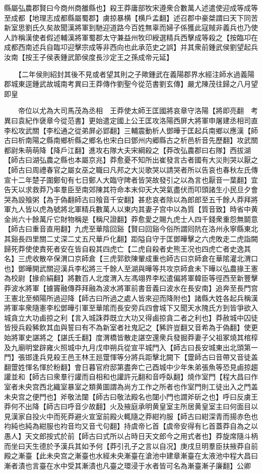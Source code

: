 縣屬弘農郡賢曰今商州商雒縣也】殺王莽庸部牧宋遵衆合數萬人述遣使迎成等成等至成都【地理志成都縣屬蜀郡】虜掠暴横【横戶孟翻】述召郡中豪桀謂曰天下同苦新室思劉氏久矣故聞漢將軍到馳迎道路今百姓無辜而婦子係獲此寇賊非義兵也乃使人詐稱漢使者假述輔漢將軍蜀郡太守兼益州牧印綬選精兵西擊成等殺之【按臨卭在成都西南述兵自臨卭迎擊宗成等非西向也此承范史之誤】并其衆前鍾武侯劉望起兵汝南【按王子侯表鍾武節侯度長沙定王之孫成帝元延】

　　【二年侯則紹封其後不見或者望其則之子歟鍾武在義陽郡界水經注師水過義陽郡城東逕鍾武故城南考異曰王莽傳作劉聖今從范書劉玄傳】嚴尤陳茂往歸之八月望即皇

　　帝位以尤為大司馬茂為丞相　王莽使太師王匡國將哀章守洛陽【將即亮翻　考異曰袁紀作襃章今從范書】更始遣定國上公王匡攻洛陽西屏大將軍申屠建丞相司直李松攻武關【李松通之從弟屏必郢翻】三輔震動析人鄧曄于匡起兵南鄉以應漢【師古曰析南陽之縣南鄉析縣之鄉名也宋白曰鄧州内郷縣古之析邑析音先歷翻】攻武關都尉朱萌萌降【降戶江翻】進攻右隊大夫宋綱殺之【莽改弘農郡曰右隊】西拔湖【師古曰湖弘農之縣也本屬京兆】莽愈憂不知所出崔發言古者國有大災則哭以厭之【師古曰周禮春官之屬女巫之職曰凡邦之大災歌哭以請哭者所以告哀也春秋左氏傳宣十二年楚子圍鄭旬有七日鄭人大臨守陴者皆哭故發引之以為言也厭音一葉翻】宜告天以求救莽乃率羣臣至南郊陳其符命本末仰天大哭氣盡伏而叩頭諸生小民旦夕會哭為設飱粥【為于偽翻師古曰飱音千安翻】甚悲哀者除以為郎郎至五千餘人莽拜將軍九人皆以虎為號將北軍精兵數萬人以東内其妻子宫中以為質【質音致】時省中黄金尚六十餘萬斤它財物稱是【稱尺證翻】莽愈愛之賜九虎士人四千錢衆重怨無鬬意【師古曰重音直用翻】九虎至華陰回谿【賢曰回谿今俗所謂囘阬在洛州永寧縣東北其谿長四里關二丈深二丈五尺華戶化翻】距隘自守于匡鄧曄擊之六虎敗走二虎詣闕歸死莽使使責死者安在皆自殺其四虎亡【二虎自殺者史熊王况也四虎亡者史逸其名】三虎收散卒保渭口京師倉【三虎郭欽陳翬成重也師古曰京師倉在華隂灌北渭口也】鄧曄開武關迎漢兵李松將三千餘人至湖與曄等共攻京師倉未下曄以弘農掾王憲為校尉【掾俞絹翻】將數百人北度渭入左馮翊界李松遣偏將軍韓臣等徑西至新豐擊莽波水將軍【據竇融傳莽拜融為波水將軍前書音義曰波水在長安南】追奔至長門宫王憲北至頻陽所過迎降【師古曰所過之處人皆來迎而降附也】諸縣大姓各起兵稱漢將軍率衆隨憲李松鄧曄引軍至華隂而長安旁兵四會城下又聞天水隗氏方到皆爭欲入城貪立大功鹵掠之利【言入城誅莽既立大功又得鹵掠貪二者之利也】莽赦城中囚徒皆授兵殺豨飲其血與誓曰有不為新室者社鬼記之【豨許豈翻又音希為于偽翻】使更始將軍史諶將之【諶氏壬翻】度渭橋皆散走諶空還衆兵發掘莽妻子父祖冢燒其棺椁及九廟明堂辟雍火照城中九月戊申朔兵從宣平城門入【師古曰長安城東出北頭第一門】張邯逢兵見殺王邑王林王廵䠠惲等分將兵距擊北闕下【䠠師古曰音帶又音徒盖翻䠠姓惲名惲於粉翻】會日暮官府邸第盡奔亡己酉城中少年朱弟張魚等恐見鹵掠趨讙並和【師古曰衆羣行讙而自相和也讙許元翻和音呼臥翻】燒作室門【程大昌曰作室者未央宫西北織室暴室之類黄圖謂為尚方工作之所者也作室門則工徒出入之門盖未央宫之便門也】斧敬法闥【師古曰敬法殿名也闥小門也謂斧斫之也】呼曰反虜王莽何不出降【師古曰呼音少故翻】火及掖庭承明黄皇室主所居黄皇室主曰何面目以見漢家自投火中而死莽避火宣室前殿火輒隨之莽紺袀服【師古曰紺深青而揚赤色也袀純也純為紺服也袀音均又音弋句翻】持虞帝匕首【虞帝安得有匕首蓋莽自為之以愚人】天文郎按式於前【師古曰式所以占時日天文郎今之用式者也】莽旋席隨斗柄而坐曰天生德於予漢兵其如予何【莽引孔子之言以自况】庚戌旦明羣臣扶掖莽自前殿之漸臺【此未央宫之漸臺也水經未央漸臺在滄池中建章漸臺在太液池中程大昌曰漸者漬也言臺在水中受其漸漬也凡臺之環浸于水者皆可名為漸臺漸子廉翻】公卿